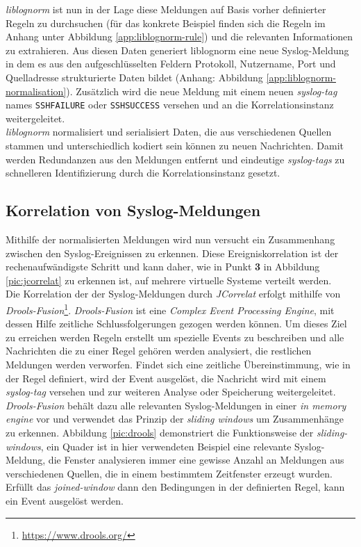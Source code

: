 \textit{liblognorm} ist nun in der Lage diese Meldungen auf Basis vorher definierter 
Regeln zu durchsuchen (für das konkrete Beispiel finden sich die Regeln im Anhang unter 
Abbildung \ref{app:liblognorm-rule}) und die relevanten Informationen zu extrahieren.  
Aus diesen Daten generiert liblognorm eine neue Syslog-Meldung in dem es aus den 
aufgeschlüsselten Feldern Protokoll, Nutzername, Port und Quelladresse strukturierte 
Daten bildet (Anhang: Abbildung \ref{app:liblognorm-normalisation}). Zusätzlich wird die 
neue Meldung mit einem neuen \textit{syslog-tag} names \texttt{SSHFAILURE} oder 
\texttt{SSHSUCCESS} versehen und an die Korrelationsinstanz weitergeleitet.\\

\textit{liblognorm} normalisiert und serialisiert Daten, die aus verschiedenen Quellen 
stammen und unterschiedlich kodiert sein können zu neuen Nachrichten. Damit werden 
Redundanzen aus den Meldungen entfernt und eindeutige \textit{syslog-tags} zu schnelleren 
Identifizierung durch die Korrelationsinstanz gesetzt. 


\newpage

\subsection{Korrelation von Syslog-Meldungen}\label{syslog-korrelation}

Mithilfe der normalisierten Meldungen wird nun versucht ein Zusammenhang zwischen den 
Syslog-Ereignissen zu erkennen. Diese Ereigniskorrelation ist der rechenaufwändigste 
Schritt und kann daher, wie in Punkt \textbf{3} in Abbildung \ref{pic:jcorrelat} zu 
erkennen ist, auf mehrere virtuelle Systeme verteilt werden.\\

Die Korrelation der der Syslog-Meldungen durch \textit{JCorrelat} erfolgt mithilfe von 
\textit{Drools-Fusion}\footnote{\url{https://www.drools.org/}}. \textit{Drools-Fusion} 
ist eine \textit{Complex Event Processing Engine}, mit dessen Hilfe zeitliche 
Schlussfolgerungen gezogen werden können. Um dieses Ziel zu erreichen werden Regeln 
erstellt um spezielle Events zu beschreiben und alle Nachrichten die zu einer Regel 
gehören werden analysiert, die restlichen Meldungen werden verworfen. Findet sich eine 
zeitliche Übereinstimmung, wie in der Regel definiert, wird der Event ausgelöst, die 
Nachricht wird mit einem \textit{syslog-tag} versehen und zur weiteren Analyse oder 
Speicherung  weitergeleitet. \textit{Drools-Fusion} behält dazu alle relevanten 
Syslog-Meldungen in einer \textit{in memory engine} vor und verwendet das Prinzip der 
\textit{sliding windows} um Zusammenhänge zu erkennen. Abbildung \ref{pic:drools} 
\cite[70]{drools-slide} demonstriert die Funktionsweise der \textit{sliding-windows}, ein 
Quader ist in hier verwendeten Beispiel eine relevante Syslog-Meldung, die Fenster 
analysieren immer eine gewisse Anzahl an Meldungen aus verschiedenen Quellen, die in 
einem bestimmtem Zeitfenster erzeugt wurden. Erfüllt das \textit{joined-window} dann den 
Bedingungen in der definierten Regel, kann ein Event ausgelöst werden.    

